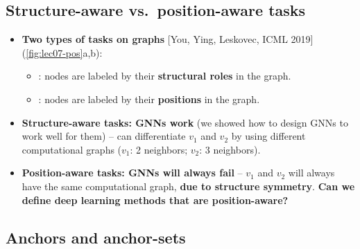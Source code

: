 \subsection{Structure-aware vs.\ position-aware tasks}\label{sec:lec07-tasks}

\begin{itemize}
  \item \textbf{Two types of tasks on graphs} [You, Ying, Leskovec, ICML 2019]
    (\cref{fig:lec07-pos}a,b):
    \begin{itemize}
      \item {}: nodes are labeled by their
        \textbf{structural roles} in the graph.
      \item {}: nodes are labeled by their
        \textbf{positions} in the graph.
    \end{itemize}
  \item \textbf{Structure-aware tasks: GNNs work} (we showed how to design GNNs
    to work well for them) -- can differentiate $v_1$ and
    $v_2$ by using different computational graphs ($v_1$: 2 neighbors; $v_2$: 3
    neighbors).
  \item \textbf{Position-aware tasks: GNNs will always fail} -- $v_1$ and $v_2$
    will always have the same computational graph, \textbf{due to structure
    symmetry}. \textbf{Can we define deep learning methods that are
    position-aware?}
\end{itemize}

\subsection{Anchors and anchor-sets}\label{sec:lec07-anchors}

